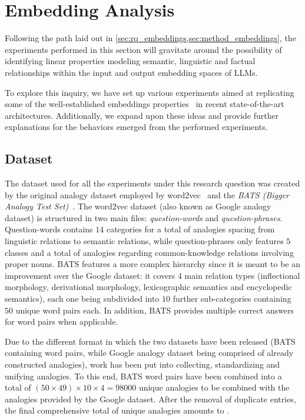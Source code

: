 \section{Embedding Analysis}

Following the path laid out in \cref{sec:rq_embeddings,sec:method_embeddings}, the experiments performed in this section will gravitate around the possibility of identifying linear properties modeling semantic, linguistic and factual relationships within the input and output embedding spaces of LLMs.

To explore this inquiry, we have set up various experiments aimed at replicating some of the well-established embeddings properties~\cite{mikolov2013} in recent state-of-the-art architectures.
Additionally, we expand upon these ideas and provide further explanations for the behaviors emerged from the performed experiments.

\subsection{Dataset}

The dataset used for all the experiments under this research question was created by  the original analogy dataset employed by word2vec~\cite{mikolov2013} and the \textit{BATS (Bigger Analogy Test Set)}~\cite{drozd2016}.
The word2vec dataset (also known as Google analogy dataset) is structured in two main files: \textit{question-words} and \textit{question-phrases}.
Question-words contains $14$ categories for a total of  analogies spacing from linguistic relations to semantic relations, while question-phrases only features $5$ classes and a total of  analogies regarding common-knowledge relations involving proper nouns.
BATS features a more complex hierarchy since it is meant to be an improvement over the Google dataset: it covers $4$ main relation types (inflectional morphology, derivational morphology, lexicographic semantics and encyclopedic semantics), each one being subdivided into $10$ further sub-categories containing $50$ unique word pairs each.
In addition, BATS provides multiple correct answers for word pairs when applicable. 

Due to the different format in which the two datasets have been released (BATS containing word pairs, while Google analogy dataset being comprised of already constructed analogies),  work has been put into collecting, standardizing and unifying analogies.
To this end, BATS word pairs have been combined into a total of $(50 \times 49) \times 10 \times 4 = 98000$ unique analogies to be combined with the  analogies provided by the Google dataset.
After the removal of duplicate entries, the final comprehensive total of unique analogies amounts to .

